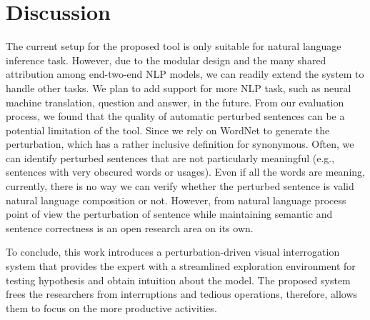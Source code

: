 \section{Discussion}
The current setup for the proposed tool is only suitable for natural language inference task. However, due to the modular design and the many shared attribution among end-two-end NLP models, we can readily extend the system to handle other tasks. We plan to add support for more NLP task, such as neural machine translation, question and answer, in the future.
%
From our evaluation process, we found that the quality of automatic perturbed sentences can be a potential limitation of the tool.
Since we rely on WordNet to generate the perturbation, which has a rather inclusive definition for synonymous. Often, we can identify perturbed sentences that are not particularly meaningful (e.g., sentences with very obscured words or usages). 
Even if all the words are meaning, currently, there is no way we can verify whether the perturbed sentence is valid natural language composition or not.
%
However, from natural language process point of view the perturbation of sentence while maintaining semantic and sentence correctness is an open research area on its own. 

To conclude, this work introduces a perturbation-driven visual interrogation system that provides the expert with a streamlined exploration environment for testing hypothesis and obtain intuition about the model. The proposed system frees the researchers from interruptions and tedious operations, therefore, allows them to focus on the more productive activities.

